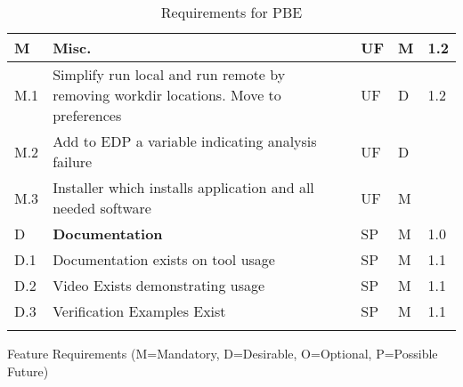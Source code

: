 \begin{longtable}{| p{} | p{} | p{} | p{} |  p{} |}
 M & \textbf{Misc.} & UF & M & 1.2  \\ \hline
   M.1 & Simplify run local and run remote by removing workdir locations. Move to preferences & UF & D & 1.2  \\ \hline
   M.2 & Add to EDP a variable indicating analysis failure & UF & D &   \\ \hline
   M.3 & Installer which installs application and all needed software & UF & M &   \\ \hline
 D & \textbf{Documentation} &  SP & M & 1.0 \\ \hline
 D.1 & Documentation exists on tool usage & SP & M & 1.1  \\ \hline
 D.2 & Video Exists demonstrating usage & SP & M & 1.1  \\ \hline
 D.3 & Verification Examples Exist & SP & M & 1.1  \\ \hline
  \bottomrule 
\caption{Requirements for PBE}
  \label{tab:featureRequirements}                 
\end{longtable}

Feature Requirements (M=Mandatory, D=Desirable, O=Optional, P=Possible Future)
